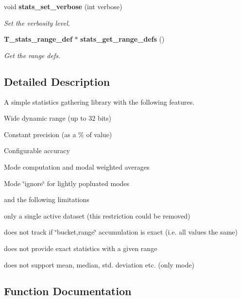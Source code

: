 \begin{CompactItemize}
void {\bf stats\_\-set\_\-verbose} (int verbose)
\begin{CompactList}\small\item\em Set the verbosity level.\item\end{CompactList}\item 
{\bf T\_\-stats\_\-range\_\-def} $\ast$ {\bf stats\_\-get\_\-range\_\-defs} ()
\begin{CompactList}\small\item\em Get the range defs.\item\end{CompactList}\end{CompactItemize}


\subsection{Detailed Description}
A simple statistics gathering library with the following features.

\begin{CompactItemize}
\item 
Wide dynamic range (up to 32 bits)\begin{CompactItemize}
\item 
Constant precision (as a \% of value)\item 
Configurable accuracy\item 
Mode computation and modal weighted averages\item 
Mode \char`\"{}ignore\char`\"{} for lightly popluated modes\end{CompactItemize}
\end{CompactItemize}
and the following limitations

\begin{CompactItemize}
\item 
only a single active dataset (this restriction could be removed)\item 
does not track if \char`\"{}bucket,range\char`\"{} accumulation is exact (i.e. all values the same)\item 
does not provide exact statistics with a given range\item 
does not support mean, median, std. deviation etc. (only mode) \end{CompactItemize}


\subsection{Function Documentation}
